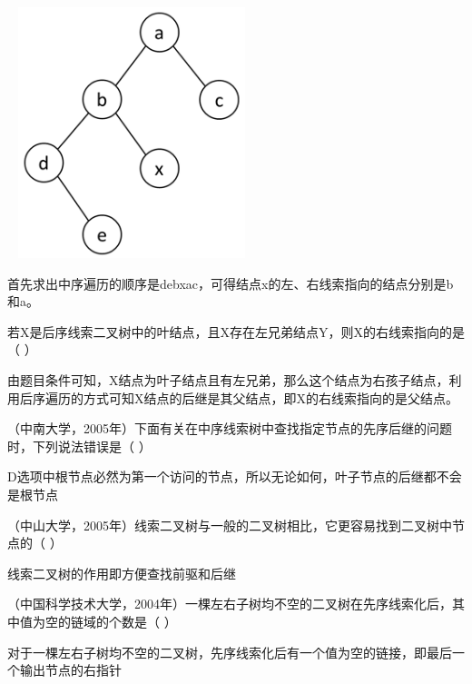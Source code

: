 ~
\includegraphics[width=2.60417in,height=2.87500in]{computerassets/E2AFE360B93D03349D89BFFBE4DFF49B.png}
\par{}
\begin{solution}首先求出中序遍历的顺序是debxac，可得结点x的左、右线索指向的结点分别是b和a。
\end{solution}
\question 若X是后序线索二叉树中的叶结点，且X存在左兄弟结点Y，则X的右线索指向的是（
）
\par{}
\begin{solution}由题目条件可知，X结点为叶子结点且有左兄弟，那么这个结点为右孩子结点，利用后序遍历的方式可知X结点的后继是其父结点，即X的右线索指向的是父结点。
\end{solution}
\question （中南大学，2005年）下面有关在中序线索树中查找指定节点的先序后继的问题时，下列说法错误是（
）
\par{}
\begin{solution}D选项中根节点必然为第一个访问的节点，所以无论如何，叶子节点的后继都不会是根节点
\end{solution}
\question （中山大学，2005年）线索二叉树与一般的二叉树相比，它更容易找到二叉树中节点的（
）
\par{}
\begin{solution}线索二叉树的作用即方便查找前驱和后继
\end{solution}
\question （中国科学技术大学，2004年）一棵左右子树均不空的二叉树在先序线索化后，其中值为空的链域的个数是（
）
\par{}
\begin{solution}对于一棵左右子树均不空的二叉树，先序线索化后有一个值为空的链接，即最后一个输出节点的右指针
\end{solution}
